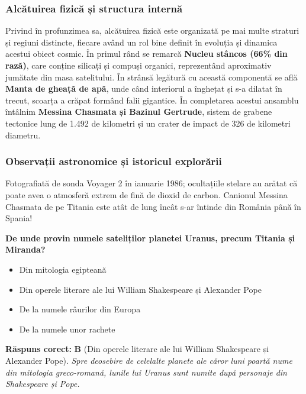 \subsubsection*{Alcătuirea fizică și structura internă}
Privind în profunzimea sa, alcătuirea fizică este organizată pe mai multe straturi și regiuni distincte, fiecare având un rol bine definit în evoluția și dinamica acestui obiect cosmic. În primul rând se remarcă \textbf{Nucleu stâncos (66\% din rază)}, care conține silicați și compuși organici, reprezentând aproximativ jumătate din masa satelitului. În strânsă legătură cu această componentă se află \textbf{Manta de gheață de apă}, unde când interiorul a înghețat și s-a dilatat în trecut, scoarța a crăpat formând falii gigantice. În completarea acestui ansamblu întâlnim \textbf{Messina Chasmata și Bazinul Gertrude}, sistem de grabene tectonice lung de 1.492 de kilometri și un crater de impact de 326 de kilometri diametru.

\subsubsection*{Observații astronomice și istoricul explorării}
Fotografiată de sonda Voyager 2 în ianuarie 1986; ocultațiile stelare au arătat că poate avea o atmosferă extrem de fină de dioxid de carbon. Canionul Messina Chasmata de pe Titania este atât de lung încât s-ar întinde din România până în Spania!

\vspace{6pt}
\begin{tcolorbox}[orbitarquiz, title={\textbf{Întrebare de verificare \#28: Titania}}]
\textbf{De unde provin numele sateliților planetei Uranus, precum Titania și Miranda?}
\begin{itemize}[leftmargin=2.2em, itemsep=2pt, topsep=4pt]
  \item[$\square$ \textbf{A.}] Din mitologia egipteană
  \item[$\square$ \textbf{B.}] Din operele literare ale lui William Shakespeare și Alexander Pope
  \item[$\square$ \textbf{C.}] De la numele râurilor din Europa
  \item[$\square$ \textbf{D.}] De la numele unor rachete
\end{itemize}
\vspace{2pt}
{\footnotesize\color{orbitarMuted}\textbf{Răspuns corect:} \textbf{B} (Din operele literare ale lui William Shakespeare și Alexander Pope). \emph{Spre deosebire de celelalte planete ale căror luni poartă nume din mitologia greco-romană, lunile lui Uranus sunt numite după personaje din Shakespeare și Pope.}}
\end{tcolorbox}
\clearpage


